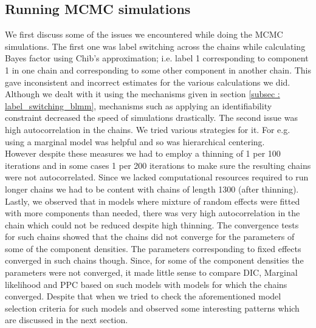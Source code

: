 \subsection{Running MCMC simulations}
We first discuss some of the issues we encountered while doing the MCMC simulations. The first one was label switching across the chains while calculating Bayes factor using Chib's approximation; i.e. label 1 corresponding to component 1 in one chain and corresponding to some other component in another chain. This gave inconsistent and incorrect estimates for the various calculations we did. Although we dealt with it using the mechanisms given in section \ref{subsec : label_switching_blmm}, mechanisms such as applying an identifiability constraint decreased the speed of simulations drastically. The second issue was high autocorrelation in the chains. We tried various strategies for it. For e.g. using a marginal model was helpful and so was hierarchical centering.\\

However despite these measures we had to employ a thinning of 1 per 100 iterations and in some cases 1 per 200 iterations to make sure the resulting chains were not autocorrelated. Since we lacked computational resources required to run longer chains we had to be content with chains of length 1300 (after thinning). Lastly, we observed that in models where mixture of random effects were fitted with more components than needed, there was very high autocorrelation in the chain which could not be reduced despite high thinning. The convergence tests for such chains showed that the chains did not converge for the parameters of some of the component densities. The parameters corresponding to fixed effects converged in such chains though. Since, for some of the component densities the parameters were not converged, it made little sense to compare DIC, Marginal likelihood and PPC based on such models with models for which the chains converged. Despite that when we tried to check the aforementioned model selection criteria for such models and observed some interesting patterns which are discussed in the next section.

